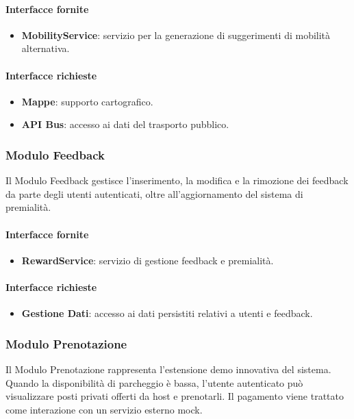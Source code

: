\documentclass[12pt,a4paper]{article}
\begin{document}
\paragraph{Interfacce fornite}
\begin{itemize}
    \item \textbf{MobilityService}: servizio per la generazione di suggerimenti di mobilità alternativa.
\end{itemize}

\paragraph{Interfacce richieste}
\begin{itemize}
    \item \textbf{Mappe}: supporto cartografico.
    \item \textbf{API Bus}: accesso ai dati del trasporto pubblico.
\end{itemize}

\subsubsection{Modulo Feedback}
Il Modulo Feedback gestisce l’inserimento, la modifica e la rimozione dei feedback da parte degli utenti autenticati, oltre all’aggiornamento del sistema di premialità.

\paragraph{Interfacce fornite}
\begin{itemize}
    \item \textbf{RewardService}: servizio di gestione feedback e premialità.
\end{itemize}

\paragraph{Interfacce richieste}
\begin{itemize}
    \item \textbf{Gestione Dati}: accesso ai dati persistiti relativi a utenti e feedback.
\end{itemize}

\subsubsection{Modulo Prenotazione}
Il Modulo Prenotazione rappresenta l’estensione demo innovativa del sistema. Quando la disponibilità di parcheggio è bassa, l’utente autenticato può visualizzare posti privati offerti da host e prenotarli. Il pagamento viene trattato come interazione con un servizio esterno mock.
\end{document}
